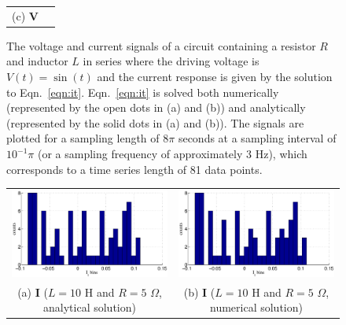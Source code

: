 \begin{figure}[ht]
\begin{center}
\begin{tabular}{cc}
(c) $\mathbf{V}$
\end{tabular}
\end{center}
\caption{The voltage and current signals of a circuit containing a resistor $R$ and inductor $L$ in series where the driving voltage is $V(t)=\sin(t)$ and the current response is given by the solution to Eqn.\ \ref{eqn:it}.  Eqn.\ \ref{eqn:it} is solved both numerically (represented by the open dots in (a) and (b)) and analytically (represented by the solid dots in (a) and (b)).  The signals are plotted for a sampling length of $8\pi$ seconds at a sampling interval of $10^{-1}\pi$ (or a sampling frequency of approximately 3 Hz), which corresponds to a time series length of 81 data points.}
\label{fig:VIplot}
\end{figure}
\begin{figure}[ht]
\begin{center}
\begin{tabular}{cc}
\includegraphics[scale=0.48]{IRCircuitResponseExampleL10R5_Yhist_an.eps} &
\includegraphics[scale=0.48]{IRCircuitResponseExampleL10R5_Yhist_num.eps} \\
(a) $\mathbf{I}$ ($L=10$ H and $R=5$ $\Omega$, analytical solution) & (b) $\mathbf{I}$ ($L=10$ H and $R=5$ $\Omega$, numerical solution)\\

\end{tabular}
\end{center}
\end{figure}
